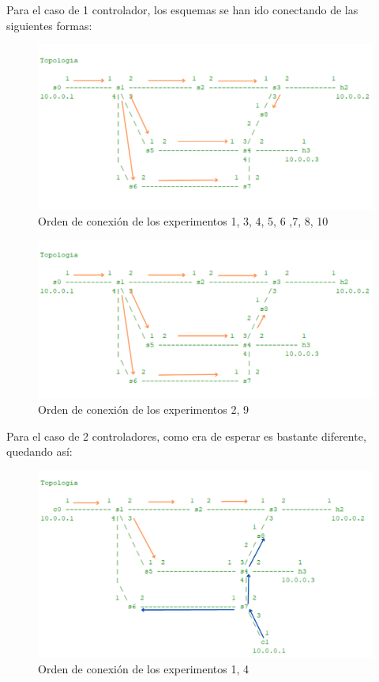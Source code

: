 \documentclass[a4paper, 12pt]{book}
\begin{document}
	Para el caso de 1 controlador, los esquemas se han ido conectando de las siguientes formas:
	
	\begin{figure}
		\centering
		\includegraphics[width=16cm, keepaspectratio]{img/escenario1_1c_1}
		\caption{Orden de conexión de los experimentos 1, 3, 4, 5, 6 ,7, 8, 10}
		\label{figura:escenario1_1c_1}
	\end{figure}
	
	\begin{figure}
		\centering
		\includegraphics[width=16cm, keepaspectratio]{img/escenario1_1c_2}
		\caption{Orden de conexión de los experimentos 2, 9}
		\label{figura:escenario1_1c_2}
	\end{figure}
	
	Para el caso de 2 controladores, como era de esperar es bastante diferente, quedando así:
	
	\begin{figure}
		\centering
		\includegraphics[width=16cm, keepaspectratio]{img/escenario1_2c_1}
		\caption{Orden de conexión de los experimentos 1, 4}
		\label{figura:escenario1_2c_1}
	\end{figure}
	
\end{document}
